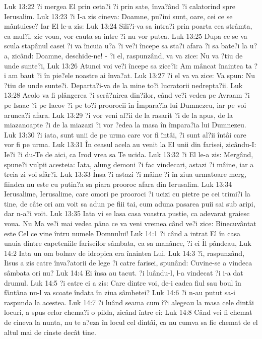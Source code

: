 Luk 13:22  ?i mergea El prin ceta?i ?i prin sate, înva?ând ?i calatorind spre Ierusalim.
Luk 13:23  ?i I-a zis cineva: Doamne, pu?ini sunt, oare, cei ce se mântuiesc? Iar El le-a zis:
Luk 13:24  Sili?i-va sa intra?i prin poarta cea strâmta, ca mul?i, zic voua, vor cauta sa intre ?i nu vor putea.
Luk 13:25  Dupa ce se va scula stapânul casei ?i va încuia u?a ?i ve?i începe sa sta?i afara ?i sa bate?i la u?a, zicând: Doamne, deschide-ne! - ?i el, raspunzând, va va zice: Nu va ?tiu de unde sunte?i,
Luk 13:26  Atunci voi ve?i începe sa zice?i: Am mâncat înaintea ta ?i am baut ?i în pie?ele noastre ai înva?at.
Luk 13:27  ?i el va va zice: Va spun: Nu ?tiu de unde sunte?i. Departa?i-va de la mine to?i lucratorii nedrepta?ii.
Luk 13:28  Acolo va fi plângerea ?i scrâ?nirea din?ilor, când ve?i vedea pe Avraam ?i pe Isaac ?i pe Iacov ?i pe to?i proorocii în Împara?ia lui Dumnezeu, iar pe voi arunca?i afara.
Luk 13:29  ?i vor veni al?ii de la rasarit ?i de la apus, de la miazanoapte ?i de la miazazi ?i vor ?edea la masa în împara?ia lui Dumnezeu.
Luk 13:30  ?i iata, sunt unii de pe urma care vor fi întâi, ?i sunt al?ii întâi care vor fi pe urma.
Luk 13:31  În ceasul acela au venit la El unii din farisei, zicându-I: Ie?i ?i du-Te de aici, ca Irod vrea sa Te ucida.
Luk 13:32  ?i El le-a zis: Mergând, spune?i vulpii acesteia: Iata, alung demoni ?i fac vindecari, astazi ?i mâine, iar a treia zi voi sfâr?i.
Luk 13:33  Însa ?i astazi ?i mâine ?i în ziua urmatoare merg, fiindca nu este cu putin?a sa piara prooroc afara din Ierusalim.
Luk 13:34  Ierusalime, Ierusalime, care omori pe prooroci ?i ucizi cu pietre pe cei trimi?i la tine, de câte ori am voit sa adun pe fiii tai, cum aduna pasarea puii sai sub aripi, dar n-a?i voit.
Luk 13:35  Iata vi se lasa casa voastra pustie, ca adevarat graiesc voua. Nu Ma ve?i mai vedea pâna ce va veni vremea când ve?i zice: Binecuvântat este Cel ce vine întru numele Domnului!
Luk 14:1  ?i când a intrat El în casa unuia dintre capeteniile fariseilor sâmbata, ca sa manânce, ?i ei Îl pândeau,
Luk 14:2  Iata un om bolnav de idropica era înaintea Lui.
Luk 14:3  ?i, raspunzând, Iisus a zis catre înva?atorii de lege ?i catre farisei, spunând: Cuvine-se a vindeca sâmbata ori nu?
Luk 14:4  Ei însa au tacut. ?i luându-l, l-a vindecat ?i i-a dat drumul.
Luk 14:5  ?i catre ei a zis: Care dintre voi, de-i cadea fiul sau boul în fântâna nu-l va scoate îndata în ziua sâmbetei?
Luk 14:6  ?i n-au putut sa-i raspunda la acestea.
Luk 14:7  ?i luând seama cum î?i alegeau la masa cele dintâi locuri, a spus celor chema?i o pilda, zicând între ei:
Luk 14:8  Când vei fi chemat de cineva la nunta, nu te a?eza în locul cel dintâi, ca nu cumva sa fie chemat de el altul mai de cinste decât tine.
